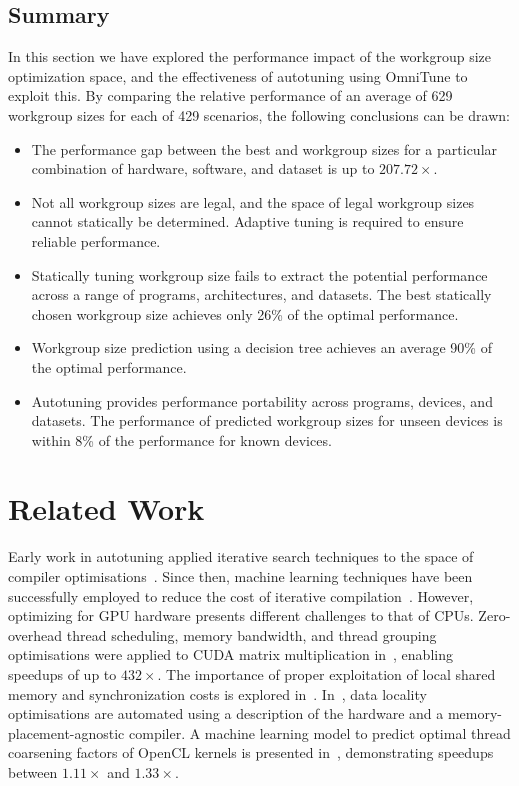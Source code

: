   \subsection{Summary}

  In this section we have explored the performance impact of the
  workgroup size optimization space, and the effectiveness of autotuning
  using OmniTune to exploit this. By comparing the relative performance
  of an average of 629 workgroup sizes for each of 429 scenarios, the
  following conclusions can be drawn:

  \begin{itemize}
    \item The performance gap between the best and workgroup sizes for a
    particular combination of hardware, software, and dataset is up to
    $207.72\times$.
    \item Not all workgroup sizes are legal, and the space of legal
    workgroup sizes cannot statically be determined. Adaptive tuning is
    required to ensure reliable performance.
    \item Statically tuning workgroup size fails to extract the potential
    performance across a range of programs, architectures, and
    datasets. The best statically chosen workgroup size achieves only
    26\% of the optimal performance.
    \item Workgroup size prediction using a decision tree achieves an
    average 90\% of the optimal performance.
    \item Autotuning provides performance portability across programs,
    devices, and datasets. The performance of predicted workgroup sizes
    for unseen devices is within 8\% of the performance for known
    devices.
  \end{itemize}


  \section{Related Work}\label{sec:related}

  Early work in autotuning applied iterative search techniques to the
  space of compiler optimisations~\cite{Bodin1998,Kisuki}. Since then,
  machine learning techniques have been successfully employed to reduce
  the cost of iterative
  compilation~\cite{Agakov,Stephenson2003,Fursin2011}. However,
  optimizing for GPU hardware presents different challenges to that of
  CPUs. Zero-overhead thread scheduling, memory bandwidth, and thread
  grouping optimisations were applied to CUDA matrix multiplication
  in~\cite{Ryoo2008a}, enabling speedups of up to $432\times$. The
  importance of proper exploitation of local shared memory and
  synchronization costs is explored
  in~\cite{Lee2010}. In~\cite{Chen2014}, data locality optimisations are
  automated using a description of the hardware and a
  memory-placement-agnostic compiler. A machine learning model to
  predict optimal thread coarsening factors of OpenCL kernels is
  presented in~\cite{Magni2014}, demonstrating speedups between
  $1.11\times$ and $1.33\times$.

